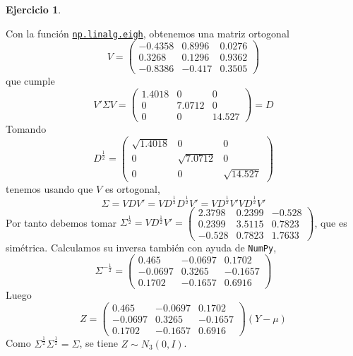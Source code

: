 \documentclass[12pt,spanish]{article}
\theoremstyle{definition}
\newtheorem{exercise}{Ejercicio}
\begin{document}
\begin{exercise}
\begin{enumerate}[a)]
    Con la función
    \href{https://numpy.org/doc/stable/reference/generated/numpy.linalg.eigh.html}{\texttt{np.linalg.eigh}},
    obtenemos una matriz ortogonal
    \[V=
      \begin{pmatrix}
        -0.4358 & 0.8996 & 0.0276 \\
        0.3268 & 0.1296 & 0.9362 \\
        -0.8386 & -0.417 & 0.3505
      \end{pmatrix}
    \] que cumple \[V'\Sigma V=
      \begin{pmatrix}
        1.4018 & 0 & 0 \\
        0 & 7.0712 & 0 \\
        0 & 0 & 14.527
      \end{pmatrix}=D\]
    Tomando \[D^\frac{1}{2}=
      \begin{pmatrix}
        \sqrt{1.4018} & 0 & 0 \\
        0 & \sqrt{7.0712} & 0 \\
        0 & 0 & \sqrt{14.527}
      \end{pmatrix}\]
    tenemos usando que $V$ es ortogonal,
    \[\Sigma=VDV'=VD^\frac{1}{2}D^\frac{1}{2}V'=VD^\frac{1}{2}V'VD^\frac{1}{2}V'\]
    Por tanto debemos tomar $\Sigma^\frac{1}{2}=VD^\frac{1}{2}V'=
    \begin{pmatrix}
      2.3798 & 0.2399 & -0.528 \\
      0.2399 & 3.5115 & 0.7823 \\
      -0.528 & 0.7823 & 1.7633
    \end{pmatrix}$, que es simétrica. Calculamos su inversa también
    con ayuda de \texttt{NumPy},
    \[\Sigma^{-\frac{1}{2}}=
      \begin{pmatrix}
        0.465 & -0.0697 & 0.1702 \\
        -0.0697 & 0.3265 & -0.1657 \\
        0.1702 & -0.1657 & 0.6916
      \end{pmatrix}\]
    Luego \[Z=\begin{pmatrix}
        0.465 & -0.0697 & 0.1702 \\
        -0.0697 & 0.3265 & -0.1657 \\
        0.1702 & -0.1657 & 0.6916
      \end{pmatrix}\left(Y-\mu\right)\]
    Como $\Sigma^\frac{1}{2}\Sigma^\frac{1}{2}=\Sigma$, se tiene $Z\sim N_3(0,I)$.
  \end{enumerate}
  
\end{exercise}
\end{document}
